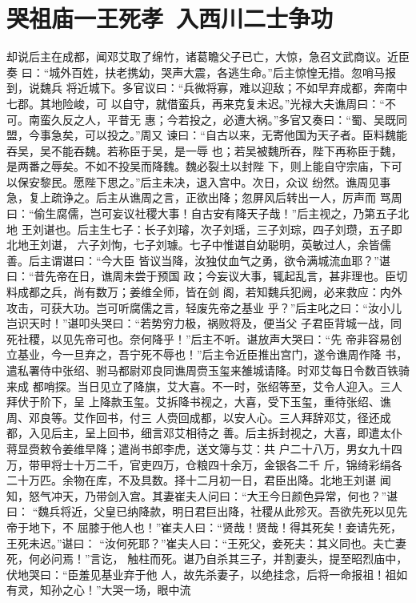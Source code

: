 \chapter{哭祖庙一王死孝~入西川二士争功}

却说后主在成都，闻邓艾取了绵竹，诸葛瞻父子已亡，大惊，急召文武商议。近臣奏
曰：“城外百姓，扶老携幼，哭声大震，各逃生命。”后主惊惶无措。忽哨马报到，说魏兵
将近城下。多官议曰：“兵微将寡，难以迎敌；不如早弃成都，奔南中七郡。其地险峻，可
以自守，就借蛮兵，再来克复未迟。”光禄大夫谯周曰：“不可。南蛮久反之人，平昔无
惠；今若投之，必遭大祸。”多官又奏曰：“蜀、吴既同盟，今事急矣，可以投之。”周又
谏曰：“自古以来，无寄他国为天子者。臣料魏能吞吴，吴不能吞魏。若称臣于吴，是一辱
也；若吴被魏所吞，陛下再称臣于魏，是两番之辱矣。不如不投吴而降魏。魏必裂土以封陛
下，则上能自守宗庙，下可以保安黎民。愿陛下思之。”后主未决，退入宫中。次日，众议
纷然。谯周见事急，复上疏诤之。后主从谯周之言，正欲出降；忽屏风后转出一人，厉声而
骂周曰：“偷生腐儒，岂可妄议社稷大事！自古安有降天子哉！”后主视之，乃第五子北地
王刘谌也。后主生七子：长子刘璿，次子刘瑶，三子刘琮，四子刘瓒，五子即北地王刘谌，
六子刘恂，七子刘璩。七子中惟谌自幼聪明，英敏过人，余皆儒善。后主谓谌曰：“今大臣
皆议当降，汝独仗血气之勇，欲令满城流血耶？”谌曰：“昔先帝在日，谯周未尝于预国
政；今妄议大事，辄起乱言，甚非理也。臣切料成都之兵，尚有数万；姜维全师，皆在剑
阁，若知魏兵犯阙，必来救应：内外攻击，可获大功。岂可听腐儒之言，轻废先帝之基业
乎？”后主叱之曰：“汝小儿岂识天时！”谌叩头哭曰：“若势穷力极，祸败将及，便当父
子君臣背城一战，同死社稷，以见先帝可也。奈何降乎！”后主不听。谌放声大哭曰：“先
帝非容易创立基业，今一旦弃之，吾宁死不辱也！”后主令近臣推出宫门，遂令谯周作降
书，遣私署侍中张绍、驸马都尉邓良同谯周赍玉玺来雒城请降。时邓艾每日令数百铁骑来成
都哨探。当日见立了降旗，艾大喜。不一时，张绍等至，艾令人迎入。三人拜伏于阶下，呈
上降款玉玺。艾拆降书视之，大喜，受下玉玺，重待张绍、谯周、邓良等。艾作回书，付三
人赍回成都，以安人心。三人拜辞邓艾，径还成都，入见后主，呈上回书，细言邓艾相待之
善。后主拆封视之，大喜，即遣太仆蒋显赍敕令姜维早降；遣尚书郎李虎，送文簿与艾：共
户二十八万，男女九十四万，带甲将士十万二千，官吏四万，仓粮四十余万，金银各二千
斤，锦绮彩绢各二十万匹。余物在库，不及具数。择十二月初一日，君臣出降。北地王刘谌
闻知，怒气冲天，乃带剑入宫。其妻崔夫人问曰：“大王今日颜色异常，何也？”谌曰：
“魏兵将近，父皇已纳降款，明日君巨出降，社稷从此殄灭。吾欲先死以见先帝于地下，不
屈膝于他人也！”崔夫人曰：“贤哉！贤哉！得其死矣！妾请先死，王死未迟。”谌曰：
“汝何死耶？”崔夫人曰：“王死父，妾死夫：其义同也。夫亡妻死，何必问焉！”言讫，
触柱而死。谌乃自杀其三子，并割妻头，提至昭烈庙中，伏地哭曰：“臣羞见基业弃于他
人，故先杀妻子，以绝挂念，后将一命报祖！祖如有灵，知孙之心！”大哭一场，眼中流

